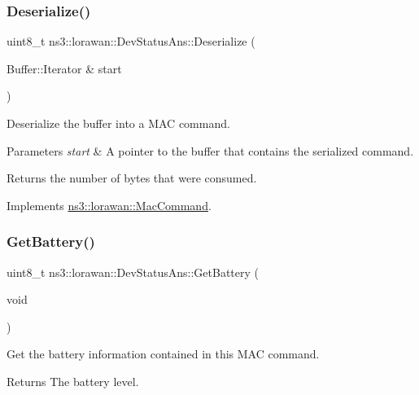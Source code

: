 \subsubsection{\texorpdfstring{Deserialize()}{Deserialize()}}
{\footnotesize\ttfamily uint8\+\_\+t ns3\+::lorawan\+::\+Dev\+Status\+Ans\+::\+Deserialize (\begin{DoxyParamCaption}\item[{Buffer\+::\+Iterator \&}]{start }\end{DoxyParamCaption})\hspace{0.3cm}{\ttfamily [virtual]}}

Deserialize the buffer into a M\+AC command.


\begin{DoxyParams}{Parameters}
{\em start} & A pointer to the buffer that contains the serialized command. \\
\hline
\end{DoxyParams}
\begin{DoxyReturn}{Returns}
the number of bytes that were consumed. 
\end{DoxyReturn}


Implements \hyperlink{classns3_1_1lorawan_1_1MacCommand_af12d223a71a67196bce498f1240eda75}{ns3\+::lorawan\+::\+Mac\+Command}.

\mbox{\label{classns3_1_1lorawan_1_1DevStatusAns_a20703d8a96ccafe156ef0403912ac1c9}} 
\subsubsection{\texorpdfstring{Get\+Battery()}{GetBattery()}}
{\footnotesize\ttfamily uint8\+\_\+t ns3\+::lorawan\+::\+Dev\+Status\+Ans\+::\+Get\+Battery (\begin{DoxyParamCaption}\item[{void}]{ }\end{DoxyParamCaption})}

Get the battery information contained in this M\+AC command.

\begin{DoxyReturn}{Returns}
The battery level. 
\end{DoxyReturn}
\mbox{\label{classns3_1_1lorawan_1_1DevStatusAns_a571f9538c6252bc91fe8dc7e7c6d0f11}} 
